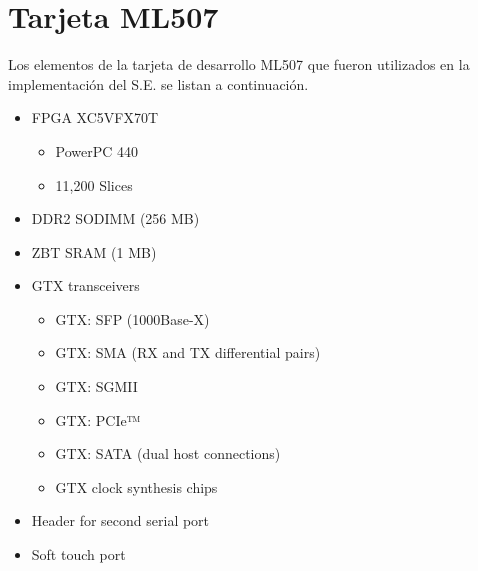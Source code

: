 \cleardoublepage
\pagestyle{plain}

\chapter{Tarjeta ML507}
Los elementos de la tarjeta de desarrollo ML507 que fueron utilizados en la implementación del S.E. se listan a continuación.


\begin{itemize}
  \item FPGA XC5VFX70T
	\begin{itemize}
	\item PowerPC 440
	\item 11,200 Slices
	\end{itemize}
  \item DDR2 SODIMM (256 MB)
  \item ZBT SRAM (1 MB)
  \item GTX transceivers
	\begin{itemize}
	\item GTX: SFP (1000Base-X)
	\item GTX: SMA (RX and TX differential pairs)
	\item GTX: SGMII
	\item GTX: PCIe™
	\item GTX: SATA (dual host connections)
	\item GTX clock synthesis chips
	\end{itemize}
  \item Header for second serial port
  \item Soft touch port
\end{itemize}


% 

